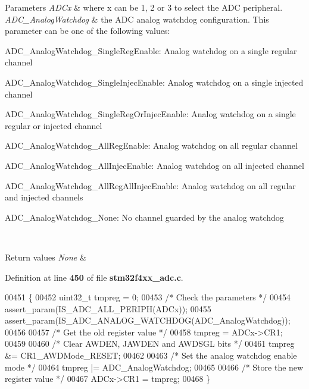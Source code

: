 \begin{DoxyParams}{Parameters}
{\em A\+D\+Cx} & where x can be 1, 2 or 3 to select the A\+DC peripheral. \\
\hline
{\em A\+D\+C\+\_\+\+Analog\+Watchdog} & the A\+DC analog watchdog configuration. This parameter can be one of the following values\+: \begin{DoxyItemize}
\item A\+D\+C\+\_\+\+Analog\+Watchdog\+\_\+\+Single\+Reg\+Enable\+: Analog watchdog on a single regular channel \item A\+D\+C\+\_\+\+Analog\+Watchdog\+\_\+\+Single\+Injec\+Enable\+: Analog watchdog on a single injected channel \item A\+D\+C\+\_\+\+Analog\+Watchdog\+\_\+\+Single\+Reg\+Or\+Injec\+Enable\+: Analog watchdog on a single regular or injected channel \item A\+D\+C\+\_\+\+Analog\+Watchdog\+\_\+\+All\+Reg\+Enable\+: Analog watchdog on all regular channel \item A\+D\+C\+\_\+\+Analog\+Watchdog\+\_\+\+All\+Injec\+Enable\+: Analog watchdog on all injected channel \item A\+D\+C\+\_\+\+Analog\+Watchdog\+\_\+\+All\+Reg\+All\+Injec\+Enable\+: Analog watchdog on all regular and injected channels \item A\+D\+C\+\_\+\+Analog\+Watchdog\+\_\+\+None\+: No channel guarded by the analog watchdog \end{DoxyItemize}
\\
\hline
\end{DoxyParams}

\begin{DoxyRetVals}{Return values}
{\em None} & \\
\hline
\end{DoxyRetVals}


Definition at line \textbf{ 450} of file \textbf{ stm32f4xx\+\_\+adc.\+c}.


\begin{DoxyCode}
00451 \{
00452   uint32\_t tmpreg = 0;
00453   \textcolor{comment}{/* Check the parameters */}
00454   assert_param(IS_ADC_ALL_PERIPH(ADCx));
00455   assert_param(IS_ADC_ANALOG_WATCHDOG(ADC\_AnalogWatchdog));
00456   
00457   \textcolor{comment}{/* Get the old register value */}
00458   tmpreg = ADCx->CR1;
00459   
00460   \textcolor{comment}{/* Clear AWDEN, JAWDEN and AWDSGL bits */}
00461   tmpreg &= CR1_AWDMode_RESET;
00462   
00463   \textcolor{comment}{/* Set the analog watchdog enable mode */}
00464   tmpreg |= ADC\_AnalogWatchdog;
00465   
00466   \textcolor{comment}{/* Store the new register value */}
00467   ADCx->CR1 = tmpreg;
00468 \}
\end{DoxyCode}
\mbox{\label{group__ADC__Group2_ga03cef3d12292ffa2b8520524d5b0226c}} 
